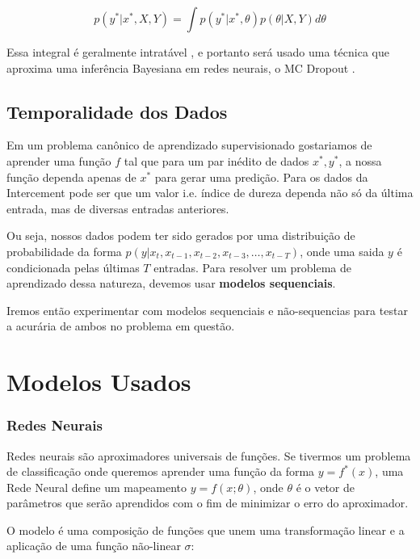 \[ p(y^* | x^* , X,Y) = \int  p(y^* | x^*,\theta) p(\theta | X,Y)  d\theta \]

Essa integral é geralmente intratável \citep{bayesml}, e portanto será usado uma técnica que aproxima uma inferência Bayesiana em redes neurais, o MC Dropout \citep{dropbayes}.


\subsection{Temporalidade dos Dados}

Em um problema canônico de aprendizado supervisionado gostariamos de aprender
uma função $f$ tal que para um par inédito de dados $x^*,y^*$, a nossa função
dependa apenas de $x^*$ para gerar uma predição. Para os dados da Intercement pode ser que um valor i.e. índice de dureza dependa não só da última entrada, mas de diversas entradas anteriores. 

Ou seja, nossos dados podem ter sido gerados por uma distribuição de probabilidade da forma $p(y | x_{t} ,x_{t -1},x_{t -2},x_{t-3} , \dots, x_{t-T})$, onde uma saida $y$ é condicionada pelas últimas $T$ entradas. Para resolver um problema de aprendizado dessa natureza, devemos usar \textbf{modelos sequenciais}. 

Iremos então experimentar com modelos sequenciais e não-sequencias para testar a acurária de ambos no problema em questão.


\section{Modelos Usados} 

\subsubsection{Redes Neurais}


Redes neurais são aproximadores universais de funções. Se tivermos um problema
de classificação onde queremos aprender uma função da forma $y = f^*(x)$, uma
Rede Neural define um mapeamento $y = f(x ; \theta)$, onde $\theta$ é o vetor de
parâmetros que serão aprendidos com o fim de minimizar o erro do aproximador.

O modelo é uma composição de funções que unem uma transformação linear e
a aplicação de uma função não-linear $\sigma$: \\


